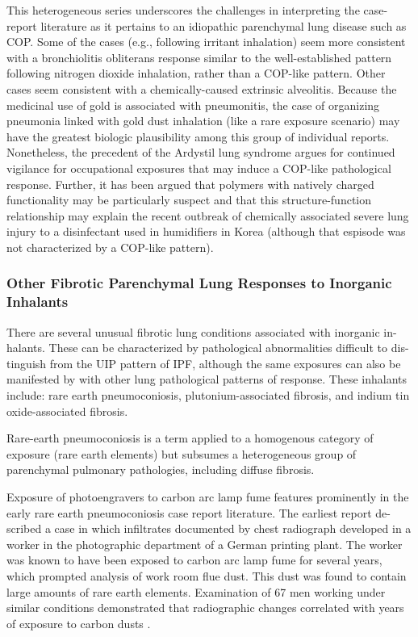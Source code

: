 \documentclass[a4paper,12pt]{article}
\begin{document}
This heterogeneous series underscores the challenges in interpreting the case- report literature as it pertains to an idiopathic parenchymal lung disease such as COP. Some of the cases (e.g., following irritant inhalation) seem more consistent with a bronchiolitis obliterans response similar to the well-established pattern following nitrogen dioxide inhalation, rather than a COP-like pattern. Other cases seem consistent with a chemically-caused extrinsic alveolitis. Because the medicinal use of gold is associated with pneumonitis\cite{Tomioka1997a}, the case of organizing pneumonia linked with gold dust inhalation (like a rare exposure scenario) may have the greatest biologic plausibility among this group of individual reports.  Nonetheless, the precedent of the Ardystil lung syndrome argues for continued vigilance for occupational exposures that may induce a COP-like pathological response. Further, it has been argued that polymers with natively charged functionality may be particularly suspect and that this structure-function relationship may explain the recent outbreak of chemically associated severe lung injury to a disinfectant used in humidifiers in Korea (although that espisode was not characterized by a COP-like pattern)\cite{Nemery2015}.

\subsubsection{Other Fibrotic Parenchymal Lung Responses to Inorganic Inhalants}
There are several unusual fibrotic lung conditions associated with inorganic in- halants. These can be characterized by pathological abnormalities difficult to dis- tinguish from the UIP pattern of IPF, although the same exposures can also be manifested by with other lung pathological patterns of response. These inhalants include: rare earth pneumoconiosis, plutonium-associated fibrosis, and indium tin oxide-associated fibrosis.

Rare-earth pneumoconiosis is a term applied to a homogenous category of exposure (rare earth elements) but subsumes a heterogeneous group of parenchymal pulmonary pathologies, including diffuse fibrosis.

Exposure of photoengravers to carbon arc lamp fume features prominently in the early rare earth pneumoconiosis case report literature. The earliest report de- scribed a case in which infiltrates documented by chest radiograph developed in a worker in the photographic department of a German printing plant. The worker was known to have been exposed to carbon arc lamp fume for several years, which prompted analysis of work room flue dust. This dust was found to contain large amounts of rare earth elements. Examination of 67 men working under similar conditions demonstrated that radiographic changes correlated with years of exposure to carbon dusts \cite{Heuck1968}.
\end{document}
